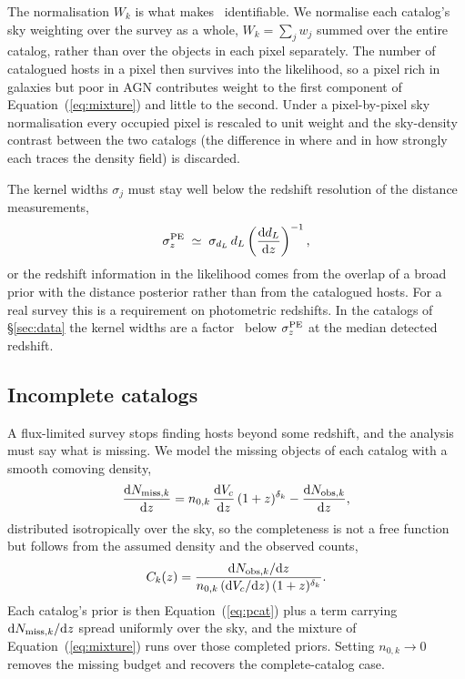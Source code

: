 The normalisation $W_k$ is what makes \fagn\ identifiable. We normalise each
catalog's sky weighting over the survey as a whole, $W_k = \sum_j w_j$ summed
over the entire catalog, rather than over the objects in each pixel separately.
The number of catalogued hosts in a pixel then survives into the likelihood, so
a pixel rich in galaxies but poor in AGN contributes weight to the first
component of Equation~(\ref{eq:mixture}) and little to the second. Under a
pixel-by-pixel sky normalisation every occupied pixel is rescaled to unit weight and the
sky-density contrast between the two catalogs (the difference in where and
in how strongly each traces the density field) is discarded.

The kernel widths $\sigma_j$ must stay well below the redshift resolution of
the distance measurements,
\begin{equation}
  \sigma_z^{\rm PE} \;\simeq\; \sigma_{d_L}\, d_L \left(
     \frac{\mathrm{d} d_L}{\mathrm{d} z} \right)^{-1},
  \label{eq:sigmazpe}
\end{equation}
or the redshift information in the likelihood comes from the overlap of a broad
prior with the distance posterior rather than from the catalogued hosts. For a
real survey this is a requirement on photometric redshifts. In the catalogs of
\S\ref{sec:data} the kernel widths are a factor \KdePeRatio\ below
$\sigma_z^{\rm PE}$ at the median detected redshift.

\subsection{Incomplete catalogs}
\label{sec:methods:completion}

A flux-limited survey stops finding hosts beyond some redshift, and the
analysis must say what is missing. We model the missing objects of each catalog
with a smooth comoving density,
\begin{equation}
  \frac{\mathrm{d} N_{{\rm miss},k}}{\mathrm{d} z} =
    n_{0,k}\, \frac{\mathrm{d} V_c}{\mathrm{d} z}\, (1+z)^{\delta_k}
    - \frac{\mathrm{d} N_{{\rm obs},k}}{\mathrm{d} z},
  \label{eq:miss}
\end{equation}
distributed isotropically over the sky, so the completeness is not a free
function but follows from the assumed density and the observed counts,
\begin{equation}
  C_k(z) = \frac{\mathrm{d} N_{{\rm obs},k}/\mathrm{d} z}
                {n_{0,k}\, (\mathrm{d} V_c/\mathrm{d} z)\, (1+z)^{\delta_k}}.
  \label{eq:completeness}
\end{equation}
Each catalog's prior is then Equation~(\ref{eq:pcat}) plus a term carrying
$\mathrm{d} N_{{\rm miss},k}/\mathrm{d} z$ spread uniformly over the sky, and the mixture of
Equation~(\ref{eq:mixture}) runs over those completed priors. Setting
$n_{0,k} \rightarrow 0$ removes the missing budget and recovers the
complete-catalog case.

